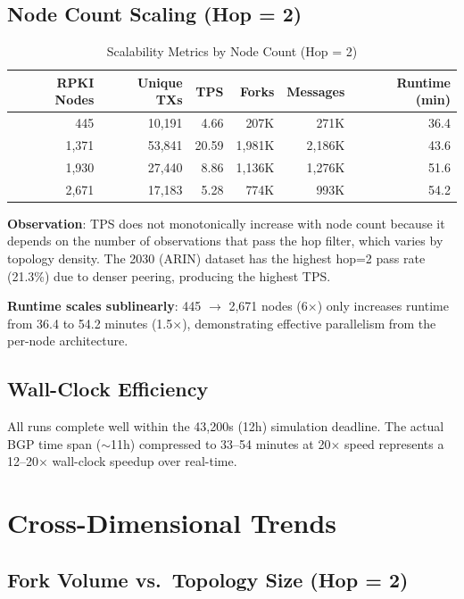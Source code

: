 \documentclass[11pt,a4paper]{article}
\begin{document}
\subsection{Node Count Scaling (Hop = 2)}

\begin{table}[H]
\centering
\caption{Scalability Metrics by Node Count (Hop = 2)}
\begin{tabular}{rrrrrr}
\toprule
\textbf{RPKI Nodes} & \textbf{Unique TXs} & \textbf{TPS} & \textbf{Forks} & \textbf{Messages} & \textbf{Runtime (min)} \\
\midrule
445   & 10,191  & 4.66  & 207K    & 271K   & 36.4 \\
1,371 & 53,841  & 20.59 & 1,981K  & 2,186K & 43.6 \\
1,930 & 27,440  & 8.86  & 1,136K  & 1,276K & 51.6 \\
2,671 & 17,183  & 5.28  & 774K    & 993K   & 54.2 \\
\bottomrule
\end{tabular}
\end{table}

\textbf{Observation}: TPS does not monotonically increase with node count because
it depends on the number of observations that pass the hop filter, which varies by
topology density. The 2030 (ARIN) dataset has the highest hop=2 pass rate (21.3\%)
due to denser peering, producing the highest TPS.

\textbf{Runtime scales sublinearly}: 445 $\to$ 2,671 nodes (6$\times$) only increases
runtime from 36.4 to 54.2 minutes (1.5$\times$), demonstrating effective parallelism
from the per-node architecture.

\subsection{Wall-Clock Efficiency}

All runs complete well within the 43,200s (12h) simulation deadline. The actual
BGP time span ($\sim$11h) compressed to 33--54 minutes at 20$\times$ speed represents
a 12--20$\times$ wall-clock speedup over real-time.

\section{Cross-Dimensional Trends}

\subsection{Fork Volume vs.\ Topology Size (Hop = 2)}
\end{document}
